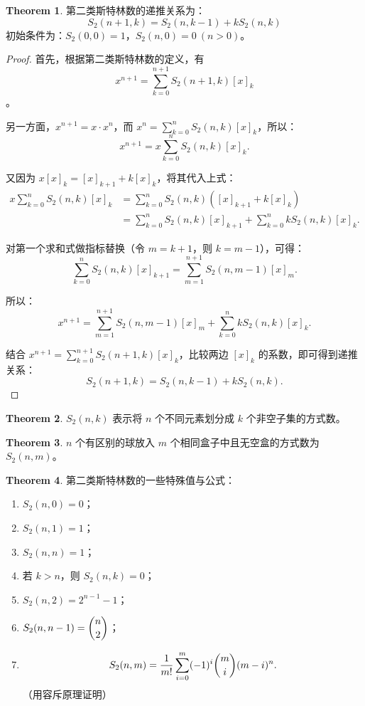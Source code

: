 \documentclass[oneside]{book}
\theoremstyle{definition}
\newtheorem{theorem}{Theorem}[section]
\begin{document}
\begin{theorem}
	第二类斯特林数的递推关系为：
	\[ S_2(n + 1, k) = S_2(n, k - 1) + k S_2(n, k) \]
	初始条件为：\( S_2(0, 0) = 1 \)，\( S_2(n, 0) = 0 \ (n > 0) \)。
\end{theorem}

\begin{proof}
	首先，根据第二类斯特林数的定义，有 \[ x^{n + 1} = \sum_{k = 0}^{n + 1} S_2(n + 1, k) [x]_k \]。
	
	另一方面，\( x^{n + 1} = x \cdot x^n \)，而 \( x^n = \sum_{k = 0}^n S_2(n, k) [x]_k \)，所以：
	\[ x^{n + 1} = x \sum_{k = 0}^n S_2(n, k) [x]_k. \]
	
	又因为 \( x [x]_k = [x]_{k + 1} + k [x]_k \)，将其代入上式：
	\[
	\begin{aligned}
		x \sum_{k = 0}^n S_2(n, k) [x]_k &= \sum_{k = 0}^n S_2(n, k) \left( [x]_{k + 1} + k [x]_k \right) \\
		&= \sum_{k = 0}^n S_2(n, k) [x]_{k + 1} + \sum_{k = 0}^n k S_2(n, k) [x]_k.
	\end{aligned}
	\]
	
	对第一个求和式做指标替换（令 \( m = k + 1 \)，则 \( k = m - 1 \)），可得：
	\[ \sum_{k = 0}^n S_2(n, k) [x]_{k + 1} = \sum_{m = 1}^{n + 1} S_2(n, m - 1) [x]_m. \]
	
	所以：
	\[ x^{n + 1} = \sum_{m = 1}^{n + 1} S_2(n, m - 1) [x]_m + \sum_{k = 0}^n k S_2(n, k) [x]_k. \]
	
	结合 \( x^{n + 1} = \sum_{k = 0}^{n + 1} S_2(n + 1, k) [x]_k \)，比较两边 \( [x]_k \) 的系数，即可得到递推关系：
	\[ S_2(n + 1, k) = S_2(n, k - 1) + k S_2(n, k). \]
\end{proof}

\begin{theorem}
	\( S_2(n, k) \) 表示将 \( n \) 个不同元素划分成 \( k \) 个非空子集的方式数。
\end{theorem}

\begin{theorem}
	\( n \) 个有区别的球放入 \( m \) 个相同盒子中且无空盒的方式数为 \( S_2(n, m) \)。
\end{theorem}

\begin{theorem}
	第二类斯特林数的一些特殊值与公式：
	\begin{enumerate}
		\item \( S_2(n, 0) = 0 \)；
		\item \( S_2(n, 1) = 1 \)；
		\item \( S_2(n, n) = 1 \)；
		\item 若 \( k > n \)，则 \( S_2(n, k) = 0 \)；
		\item \( S_2(n, 2) = 2^{n - 1} - 1 \)；
		\item \( S_2(n, n - 1) = \dbinom{n}{2} \)；
		\item \[ S_2(n, m) = \dfrac{1}{m!} \sum_{i = 0}^m (-1)^i \dbinom{m}{i} (m - i)^n .\]（用容斥原理证明）
	\end{enumerate}
\end{theorem}
\end{document}
